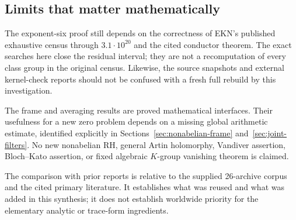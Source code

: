 \subsection{Limits that matter mathematically}

The exponent-six proof still depends on the correctness of EKN's published exhaustive census through $3.1\cdot10^{20}$ and the cited conductor theorem. The exact searches here close the residual interval; they are not a recomputation of every class group in the original census. Likewise, the source snapshots and external kernel-check reports should not be confused with a fresh full rebuild by this investigation.

The frame and averaging results are proved mathematical interfaces. Their usefulness for a new zero problem depends on a missing global arithmetic estimate, identified explicitly in Sections~\ref{sec:nonabelian-frame} and~\ref{sec:joint-filters}. No new nonabelian RH, general Artin holomorphy, Vandiver assertion, Bloch--Kato assertion, or fixed algebraic $K$-group vanishing theorem is claimed.

The comparison with prior reports is relative to the supplied 26-archive corpus and the cited primary literature. It establishes what was reused and what was added in this synthesis; it does not establish worldwide priority for the elementary analytic or trace-form ingredients.

